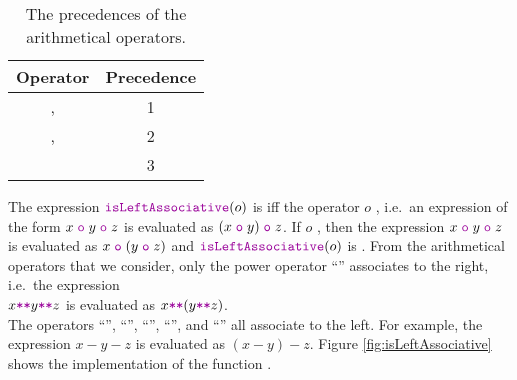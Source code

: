 \begin{table}[!ht]
  \centering
    \begin{tabular}{|c|c|}
    \hline
      Operator & Precedence \\
    \hline\hline
      \mytt{+}, \mytt{-} & 1 \\
    \hline
      \mytt{*}, \mytt{/} & 2 \\
    \hline
      \mytt{**}           & 3 \\
    \hline
    \end{tabular}
  \caption{The precedences of the arithmetical operators.}
  \label{tab:precedence}
\end{table}

The expression $\mytt{isLeftAssociative}(o)$ is  iff the operator $o$ 
,  i.e.~an expression of the form $x \;\mytt{o}\; y \;\mytt{o}\; z$
is evaluated as  $(x \;\mytt{o}\; y) \;\mytt{o}\; z$.  If $o$ ,
 then the expression  $x \;\mytt{o}\; y \;\mytt{o}\; z$
is evaluated as  $x \;\mytt{o}\; (y \;\mytt{o}\; z)$ and $\mytt{isLeftAssociative}(o)$
is .  From the arithmetical operators that we consider, only the power operator ``\mytt{**}'' 
associates to the right, i.e.~the expression
\\[0.2cm]
\hspace*{1.3cm}
$x \mytt{**} y \mytt{**} z$ \quad is evaluated as \quad $x \mytt{**} (y \mytt{**} z)$.
\\[0.2cm]
The operators 
``\mytt{+}'', ``\mytt{-}'', ``\mytt{*}'', ``\mytt{/}'', and ``\mytt{\%}'' 
all associate to the left.  For example, the expression
$x - y - z$ is evaluated as $(x - y) - z$.
Figure \ref{fig:isLeftAssociative} shows the implementation of the function .

